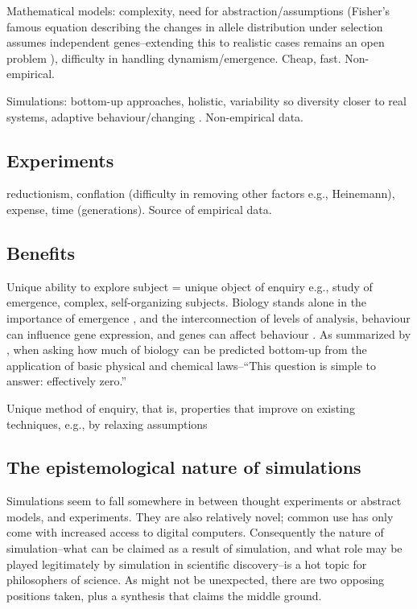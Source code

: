 Mathematical models: complexity, need for abstraction/assumptions
(\eg Fisher's famous equation describing the changes in allele
distribution under selection assumes independent genes--extending this
to realistic cases remains an open problem \autocite{Schuster2011}),
difficulty in handling dynamism/emergence. Cheap, fast. Non-empirical.

Simulations: bottom-up approaches, holistic, variability so diversity
closer to real systems, adaptive behaviour/changing
\autocite{Ferrer:2008hv}. Non-empirical data.

\subsection{Experiments}\label{experiments}

reductionism, conflation (difficulty in removing other factors e.g.,
Heinemann), expense, time (generations). Source of empirical data.


\subsection{Benefits}\label{benefits}

Unique ability to explore subject = unique object of enquiry e.g., study
of emergence, complex, self-organizing subjects. Biology stands alone in
the importance of emergence \autocite{Bersini:2006ve}, and the
interconnection of levels of analysis, \eg behaviour can influence gene
expression, and genes can affect behaviour \autocite{Krakauer2011}. As
summarized by \autocite{Krakauer2011}, when asking how much of biology
can be predicted bottom-up from the application of basic physical and
chemical laws--``This question is simple to answer: effectively zero.''

Unique method of enquiry, that is, properties that improve on existing
techniques, e.g., by relaxing assumptions

\subsection{The epistemological nature of simulations}\label{the-epistemological-nature-of-simulations}

Simulations seem to fall somewhere in between thought experiments or
abstract models, and experiments. They are also relatively novel; common
use has only come with increased access to digital computers.
Consequently the nature of simulation--what can be claimed as a result
of simulation, and what role may be played legitimately by simulation in
scientific discovery--is a hot topic for philosophers of science. As
might not be unexpected, there are two opposing positions taken, plus a
synthesis that claims the middle ground.

